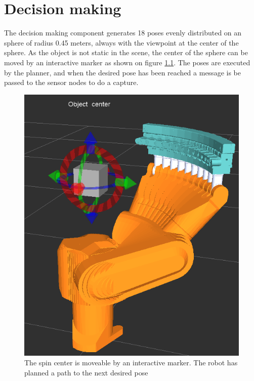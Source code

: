 \chapter{Decision making}
The decision making component generates 18 poses evenly distributed on an sphere of radius 0.45 meters, always with the viewpoint at the center of the sphere. As the object is not static in the scene, the center of the sphere can be moved by an interactive marker as shown on figure \ref{fig:robot_moving_around_object}. The poses are executed by the planner, and when the desired pose has been reached a message is be passed to the sensor nodes to do a capture.


\begin{figure}[htb]
	\begin{center}
		\includegraphics[scale=0.5,trim=0 0 0 0]{graphics/04_decisionmaking/robot_moving_around_object.png}%
		\caption{The spin center is moveable by an interactive marker. The robot has planned a path to the next desired pose}
		\label{fig:robot_moving_around_object}
	\end{center}
\end{figure}

